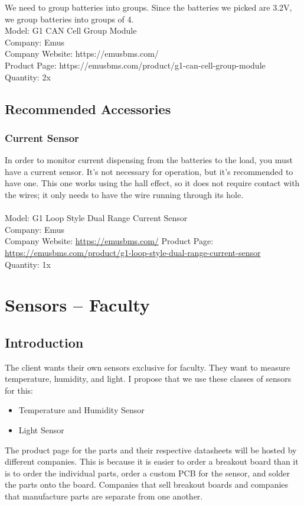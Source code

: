 We need to group batteries into groups.
Since the batteries we picked are 3.2V, we group batteries into groups of 4.  
 \\
Model: G1 CAN Cell Group Module\\
Company: Emus \\
Company Website: https://emusbms.com/ \\
Product Page: https://emusbms.com/product/g1-can-cell-group-module \\
Quantity: 2x\\


\subsection{Recommended Accessories}

\subsubsection{Current Sensor}

In order to monitor current dispensing from the batteries to the load, you must have a current sensor. It’s not necessary for operation, but it’s recommended to have one. This one works using the hall effect, so it does not require contact with the wires; it only needs to have the wire running through its hole. \\
 \\
Model: G1 Loop Style Dual Range Current Sensor\\
Company: Emus \\
Company Website: \href{https://emusbms.com/}{https://emusbms.com/}
Product Page: \href{https://emusbms.com/product/g1-loop-style-dual-range-current-sensor}{https://emusbms.com/product/g1-loop-style-dual-range-current-sensor}\\
Quantity: 1x \\



 
\section{Sensors – Faculty}
\subsection{Introduction}
The client wants their own sensors exclusive for faculty. They want to measure temperature, humidity, and light. I propose that we use these classes of sensors for this:\\
\begin{itemize}
	\item Temperature and Humidity Sensor
	\item Light Sensor
\end{itemize}
The product page for the parts and their respective datasheets will be hosted by different companies. This is because it is easier to order a breakout board than it is to order the individual parts, order a custom PCB for the sensor, and solder the parts onto the board. Companies that sell breakout boards and companies that manufacture parts are separate from one another.

